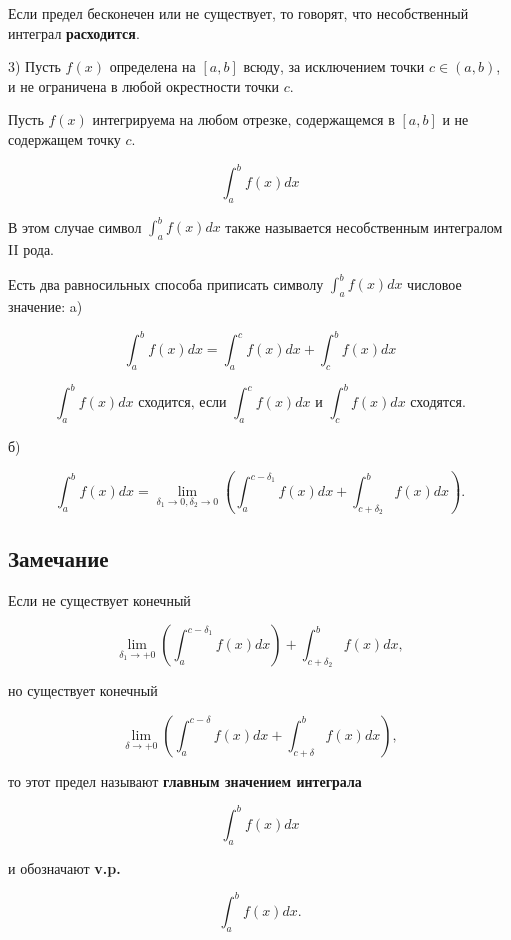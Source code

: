 {Если предел бесконечен или не существует, то говорят, что несобственный интеграл \textbf{расходится}.

3) Пусть \( f(x) \) определена на \( [a, b] \) всюду, за исключением точки \( c \in (a, b) \), и не ограничена в любой окрестности точки \( c \).

Пусть \( f(x) \) интегрируема на любом отрезке, содержащемся в \( [a, b] \) и не содержащем точку \( c \).



\[
\int_{a}^{b} f(x)dx
\]



В этом случае символ \( \int_{a}^{b} f(x)dx \) также называется несобственным интегралом II рода.

Есть два равносильных способа приписать символу \( \int_{a}^{b} f(x)dx \) числовое значение:
a)


\[
\int_{a}^{b} f(x)dx = \int_{a}^{c} f(x)dx + \int_{c}^{b} f(x)dx
\]

\[
\int_{a}^{b} f(x)dx \text{ сходится, если } \int_{a}^{c} f(x)dx \text{ и } \int_{c}^{b} f(x)dx \text{ сходятся.}
\]

б)

\[
\int_{a}^{b} f(x)dx = \lim_{\delta_{1} \to 0, \delta_{2} \to 0} \left( \int_{a}^{c-\delta_{1}} f(x)dx + \int_{c+\delta_{2}}^{b} f(x)dx \right).
\]


\subsection*{Замечание}

Если не существует конечный 



\[
\lim_{\delta_1 \to +0} \left( \int_{a}^{c-\delta_1} f(x)dx \right) + \int_{c+\delta_2}^{b} f(x)dx,
\]



но существует конечный 



\[
\lim_{\delta \to +0} \left( \int_{a}^{c-\delta} f(x)dx + \int_{c+\delta}^{b} f(x)dx \right),
\]



то этот предел называют \textbf{главным значением интеграла}



\[
\int_{a}^{b} f(x)dx
\]



и обозначают \textbf{v.p.}



\[
\int_{a}^{b} f(x)dx.
\]



}

